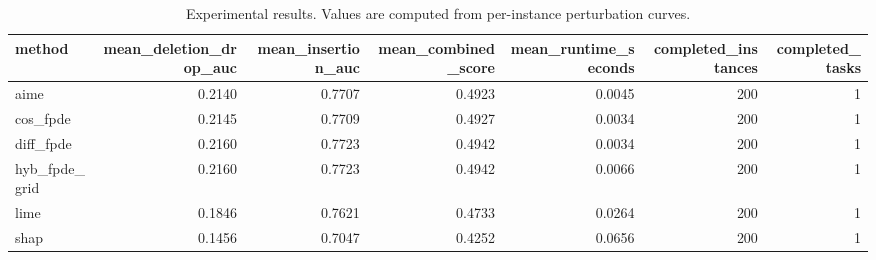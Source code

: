 \begin{table}[t]
\caption{Experimental results. Values are computed from per-instance perturbation curves.}
\label{tab:main_results_computed}
\centering
\begin{tabular}{lrrrrrr}
\toprule
method & mean\_deletion\_drop\_auc & mean\_insertion\_auc & mean\_combined\_score & mean\_runtime\_seconds & completed\_instances & completed\_tasks \\
\midrule
aime & 0.2140 & 0.7707 & 0.4923 & 0.0045 & 200 & 1 \\
cos\_fpde & 0.2145 & 0.7709 & 0.4927 & 0.0034 & 200 & 1 \\
diff\_fpde & 0.2160 & 0.7723 & 0.4942 & 0.0034 & 200 & 1 \\
hyb\_fpde\_grid & 0.2160 & 0.7723 & 0.4942 & 0.0066 & 200 & 1 \\
lime & 0.1846 & 0.7621 & 0.4733 & 0.0264 & 200 & 1 \\
shap & 0.1456 & 0.7047 & 0.4252 & 0.0656 & 200 & 1 \\
\bottomrule
\end{tabular}

\end{table}
